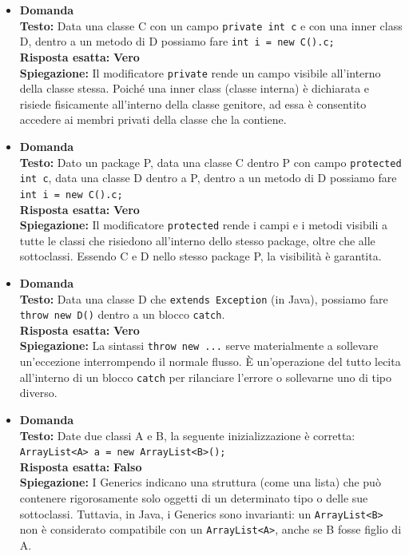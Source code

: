 \documentclass[12pt, a4paper]{article}
\begin{document}
\begin{itemize}
    \item {}\textbf{Domanda \thedomanda} \\
    \textbf{Testo:} Data una classe C con un campo \texttt{private int c} e con una inner class D, dentro a un metodo di D possiamo fare \texttt{int i = new C().c;} \\
    \textbf{Risposta esatta:} \textbf{Vero} \\
    \textbf{Spiegazione:} Il modificatore \texttt{private} rende un campo visibile all'interno della classe stessa. Poiché una inner class (classe interna) è dichiarata e risiede fisicamente all'interno della classe genitore, ad essa è consentito accedere ai membri privati della classe che la contiene.
    \vspace{0.3cm}

    \item {}\textbf{Domanda \thedomanda} \\
    \textbf{Testo:} Dato un package P, data una classe C dentro P con campo \texttt{protected int c}, data una classe D dentro a P, dentro a un metodo di D possiamo fare \texttt{int i = new C().c;} \\
    \textbf{Risposta esatta:} \textbf{Vero} \\
    \textbf{Spiegazione:} Il modificatore \texttt{protected} rende i campi e i metodi visibili a tutte le classi che risiedono all'interno dello stesso package, oltre che alle sottoclassi. Essendo C e D nello stesso package P, la visibilità è garantita.
    \vspace{0.3cm}

    \item {}\textbf{Domanda \thedomanda} \\
    \textbf{Testo:} Data una classe D che \texttt{extends Exception} (in Java), possiamo fare \texttt{throw new D()} dentro a un blocco \texttt{catch}. \\
    \textbf{Risposta esatta:} \textbf{Vero} \\
    \textbf{Spiegazione:} La sintassi \texttt{throw new ...} serve materialmente a sollevare un'eccezione interrompendo il normale flusso. È un'operazione del tutto lecita all'interno di un blocco \texttt{catch} per rilanciare l'errore o sollevarne uno di tipo diverso.
    \vspace{0.3cm}

    \item {}\textbf{Domanda \thedomanda} \\
    \textbf{Testo:} Date due classi A e B, la seguente inizializzazione è corretta:\\ \verb|ArrayList<A> a = new ArrayList<B>();| \\
    \textbf{Risposta esatta:} \textbf{Falso} \\
    \textbf{Spiegazione:} I Generics indicano una struttura (come una lista) che può contenere rigorosamente solo oggetti di un determinato tipo o delle sue sottoclassi. Tuttavia, in Java, i Generics sono invarianti: un \verb|ArrayList<B>| non è considerato compatibile con un \verb|ArrayList<A>|, anche se B fosse figlio di A.
    \vspace{0.3cm}


\end{itemize}
\end{document}
